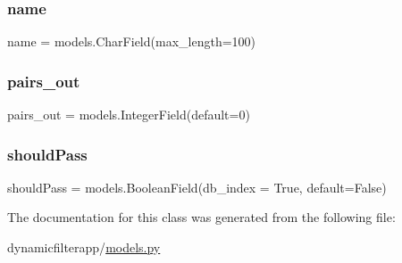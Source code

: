 \mbox{\label{classdynamicfilterapp_1_1models_1_1_item_ab74e6bf80237ddc4109968cedc58c151}} 
\subsubsection{\texorpdfstring{name}{name}}
{\footnotesize\ttfamily name = models.\+Char\+Field(max\+\_\+length=100)\hspace{0.3cm}{\ttfamily [static]}}

\mbox{\label{classdynamicfilterapp_1_1models_1_1_item_a9290ec0d1f62bda2041497209d4f9895}} 
\subsubsection{\texorpdfstring{pairs\_out}{pairs\_out}}
{\footnotesize\ttfamily pairs\+\_\+out = models.\+Integer\+Field(default=0)\hspace{0.3cm}{\ttfamily [static]}}

\mbox{\label{classdynamicfilterapp_1_1models_1_1_item_a1abc5225054f7c37dcefe2ca69594650}} 
\subsubsection{\texorpdfstring{shouldPass}{shouldPass}}
{\footnotesize\ttfamily should\+Pass = models.\+Boolean\+Field(db\+\_\+index = True, default=False)\hspace{0.3cm}{\ttfamily [static]}}



The documentation for this class was generated from the following file\+:\begin{DoxyCompactItemize}
\item 
dynamicfilterapp/\mbox{\hyperlink{models_8py}{models.\+py}}\end{DoxyCompactItemize}
